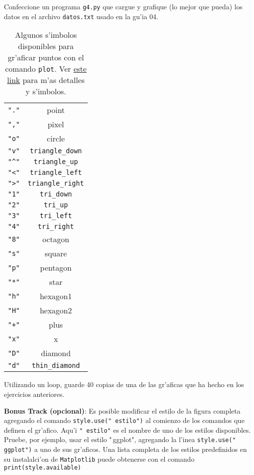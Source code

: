 \documentclass[11pt]{exam}
\begin{document}
\begin{questions}
\item Confeccione un programa \texttt{g4.py} que cargue y grafique (lo mejor que pueda) los datos en el archivo \texttt{datos.txt} usado en la gu'ia 04.%
\begin{table}
\begin{center}
\begin{tabular}{cc}
\verb|"."|	& point \\
\verb|","| & pixel \\
\verb|"o"|	& circle \\
\verb|"v"|	& \verb|triangle_down| \\
\verb|"^"|	& \verb|triangle_up| \\
\verb|"<"|	& \verb|triangle_left| \\
\verb|">"|	& \verb|triangle_right| \\
\verb|"1"|	& \verb|tri_down| \\
\verb|"2"|	& \verb|tri_up| \\
\verb|"3"|	& \verb|tri_left| \\
\verb|"4"|	& \verb|tri_right| \\
\verb|"8"|	& octagon \\
\verb|"s"|	& square \\
\verb|"p"|	& pentagon \\
\verb|"*"|	& star \\
\verb|"h"|	& hexagon1 \\
\verb|"H"|	& hexagon2 \\
\verb|"+"|	& plus \\
\verb|"x"|	& x \\
\verb|"D"|	& diamond \\
\verb|"d"|	& \verb|thin_diamond| 
\end{tabular}
\caption{Algunos s'imbolos disponibles para gr'aficar puntos con el comando \texttt{plot}. Ver \href{http://matplotlib.org/api/markers_api.html}{este link} para m'as detalles y s'imbolos.}
\label{t}
\end{center}
\end{table}

\item Utilizando un loop, guarde 40 copias de una de las gr'aficas que ha hecho en los ejercicios 
anteriores.

\item \textbf{Bonus Track (opcional)}: Es posible modificar el estilo de la figura completa agregando el comando \texttt{style.use("\,\!estilo")} al comienzo de los comandos que definen el gr'afico. Aqu'i \texttt{"\,\!estilo"} es el nombre de uno de los estilos disponibles. Pruebe, por ejemplo, usar el estilo "\,\!ggplot", agregando la l'inea \texttt{style.use("\,\!ggplot")} a uno de sus gr'aficos. Una lista completa de los estilos predefinidos en su instalalci'on de \texttt{Matplotlib} puede obtenerse con el comando \texttt{print(style.available)}


\end{questions}
\end{document}
